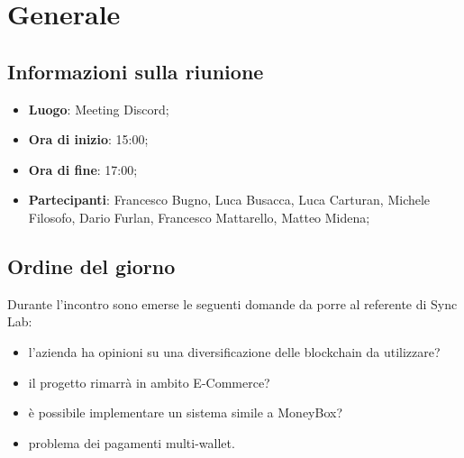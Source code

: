 \section{Generale}

\vspace{10pt}


\subsection{Informazioni sulla riunione}
\begin{itemize}
	\item \textbf{Luogo}: Meeting Discord;
	\item \textbf{Ora di inizio}: 15:00;
	\item \textbf{Ora di fine}: 17:00;
	\item \textbf{Partecipanti}: Francesco Bugno, Luca Busacca, Luca Carturan, Michele Filosofo, Dario Furlan, Francesco Mattarello, Matteo Midena;
\end{itemize}

\vspace{5pt}

\subsection{Ordine del giorno}
Durante l'incontro sono emerse le seguenti domande da porre al referente di Sync Lab:
\begin{itemize}
	\item l'azienda ha opinioni su una diversificazione delle blockchain da utilizzare?
	\item il progetto rimarrà in ambito E-Commerce\glo?
	\item è possibile implementare un sistema simile a MoneyBox\glo?
	\item problema dei pagamenti multi-wallet\glo.
\end{itemize}
